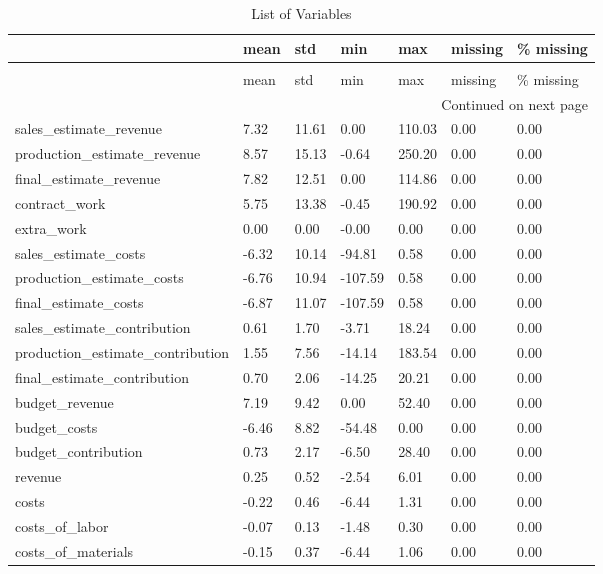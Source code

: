 \begin{landscape}\begin{longtable}[h!]{lllllll}
\caption{List of Variables} \label{eda_1} \\
\toprule
 & mean & std & min & max & missing & \% missing \\
\midrule
\endfirsthead
\caption[]{List of Variables} \\
\toprule
 & mean & std & min & max & missing & \% missing \\
\midrule
\endhead
\midrule
\multicolumn{7}{r}{Continued on next page} \\
\midrule
\endfoot
\bottomrule
\endlastfoot
sales_estimate_revenue & 7.32 & 11.61 & 0.00 & 110.03 & 0.00 & 0.00 \\
production_estimate_revenue & 8.57 & 15.13 & -0.64 & 250.20 & 0.00 & 0.00 \\
final_estimate_revenue & 7.82 & 12.51 & 0.00 & 114.86 & 0.00 & 0.00 \\
contract_work & 5.75 & 13.38 & -0.45 & 190.92 & 0.00 & 0.00 \\
extra_work & 0.00 & 0.00 & -0.00 & 0.00 & 0.00 & 0.00 \\
sales_estimate_costs & -6.32 & 10.14 & -94.81 & 0.58 & 0.00 & 0.00 \\
production_estimate_costs & -6.76 & 10.94 & -107.59 & 0.58 & 0.00 & 0.00 \\
final_estimate_costs & -6.87 & 11.07 & -107.59 & 0.58 & 0.00 & 0.00 \\
sales_estimate_contribution & 0.61 & 1.70 & -3.71 & 18.24 & 0.00 & 0.00 \\
production_estimate_contribution & 1.55 & 7.56 & -14.14 & 183.54 & 0.00 & 0.00 \\
final_estimate_contribution & 0.70 & 2.06 & -14.25 & 20.21 & 0.00 & 0.00 \\
budget_revenue & 7.19 & 9.42 & 0.00 & 52.40 & 0.00 & 0.00 \\
budget_costs & -6.46 & 8.82 & -54.48 & 0.00 & 0.00 & 0.00 \\
budget_contribution & 0.73 & 2.17 & -6.50 & 28.40 & 0.00 & 0.00 \\
revenue & 0.25 & 0.52 & -2.54 & 6.01 & 0.00 & 0.00 \\
costs & -0.22 & 0.46 & -6.44 & 1.31 & 0.00 & 0.00 \\
costs_of_labor & -0.07 & 0.13 & -1.48 & 0.30 & 0.00 & 0.00 \\
costs_of_materials & -0.15 & 0.37 & -6.44 & 1.06 & 0.00 & 0.00 \\

\end{longtable}
\end{landscape}
